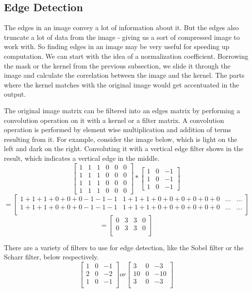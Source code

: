 \documentclass{article}
\begin{document}
\subsection{Edge Detection}

The edges in an image convey a lot of information about it. But the edges also truncate a lot of data from the image - giving us a sort of compressed image to work with. So finding edges in an image may be very useful for speeding up computation. We can start with the idea of a normalization coefficient. Borrowing the mask or the kernel from the previous subsection, we slide it through the image and calculate the correlation between the image and the kernel. The parts where the kernel matches with the original image would get accentuated in the output. 

The original image matrix can be filtered into an edges matrix by performing a convolution operation on it with a kernel or a filter matrix. A convolution operation is performed by element wise multiplication and addition of terms resulting from it. For example, consider the image below, which is light on the left and dark on the right. Convoluting it with a vertical edge filter shows in the result, which indicates a vertical edge in the middle.
$$\begin{bmatrix}
1 & 1 & 1 & 0 & 0 & 0\\
1 & 1 & 1 & 0 & 0 & 0\\
1 & 1 & 1 & 0 & 0 & 0\\
1 & 1 & 1 & 0 & 0 & 0
\end{bmatrix}
*
\begin{bmatrix}
1 & 0 & -1\\
1 & 0 & -1\\
1 & 0 & -1
\end{bmatrix}
$$$$
=
\begin{bmatrix}
1+1+1+0+0+0-1-1-1 & 1+1+1+0+0+0+0+0+0 & ... & ...\\
1+1+1+0+0+0-1-1-1 & 1+1+1+0+0+0+0+0+0 & ... & ...\\
\end{bmatrix}
$$$$
=
\begin{bmatrix}
0 & 3 & 3 & 0\\
0 & 3 & 3 & 0\\
\end{bmatrix}$$

There are a variety of filters to use for edge detection, like the Sobel filter or the Scharr filter, below respectively.
$$
\begin{bmatrix}
1 & 0 & -1\\
2 & 0 & -2\\
1 & 0 & -1\\
\end{bmatrix}
or
\begin{bmatrix}
3 & 0 & -3\\
10 & 0 & -10\\
3 & 0 & -3\\
\end{bmatrix}
$$
\end{document}
